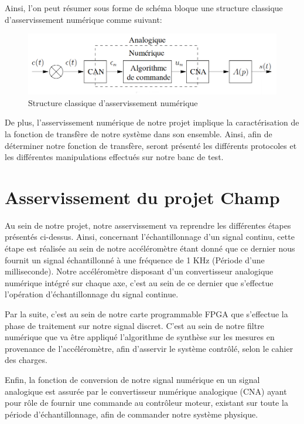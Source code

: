 \documentclass[french,a4paper,12pt]{report}
\begin{document}
	Ainsi, l'on peut résumer sous forme de schéma bloque une structure classique d'asservissement numérique comme suivant:
	
	\begin{figure}[!ht]
    \center
  	\includegraphics[width=17cm]{Assert_1.png}
    \caption{Structure classique d'asservissement numérique}
	\end{figure}	
	
	De plus, l'asservissement numérique de notre projet implique la caractérisation de la fonction de transfère de notre système dans son ensemble.
	Ainsi, afin de déterminer notre fonction de transfère, seront présenté les différents protocoles et les différentes manipulations effectués sur notre banc de test.

	\chapter{Asservissement du projet Champ}
	
		Au sein de notre projet, notre asservissement va reprendre les différentes étapes présentés ci-dessus. Ainsi, concernant l'échantillonnage d'un signal continu, cette étape est réalisée au sein de notre accéléromètre étant donné que ce dernier nous fournit un signal échantillonné à une fréquence de 1 KHz (Période d'une milliseconde). Notre accéléromètre disposant d'un convertisseur analogique numérique intégré sur chaque axe, c'est au sein de ce dernier que s'effectue l'opération d'échantillonnage du signal continue.
		
		Par la suite, c'est au sein de notre carte programmable FPGA que s'effectue la phase de traitement sur notre signal discret. C'est au sein de notre filtre numérique que va être appliqué l'algorithme de synthèse sur les mesures en provenance de l'accéléromètre, afin d'asservir le système contrôlé, selon le cahier des charges.
				
		Enfin, la fonction de conversion de notre signal numérique en un signal analogique est assurée par le convertisseur numérique analogique (CNA) ayant pour rôle de fournir une commande au contrôleur moteur, existant sur toute la période d'échantillonnage, afin de commander notre système physique.
		
\end{document}
